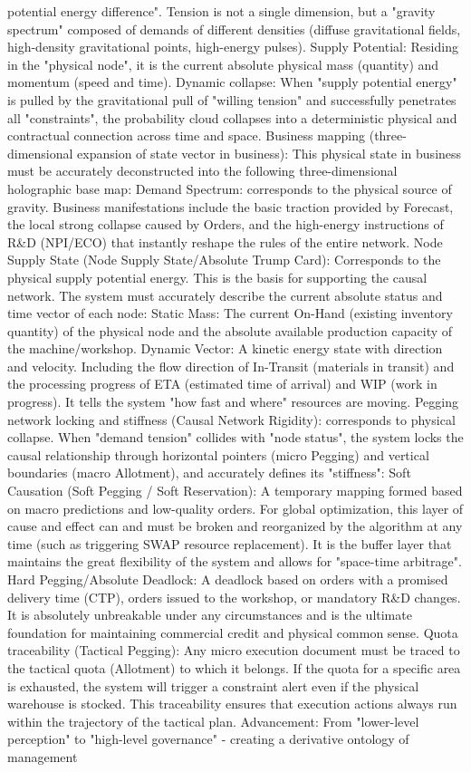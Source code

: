 \documentclass[11pt,a4paper]{article}
\begin{document}
potential energy difference". Tension is not a single dimension, but a "gravity spectrum" composed of demands of different densities (diffuse gravitational fields, high-density gravitational points, high-energy pulses). Supply Potential: Residing in the "physical node", it is the current absolute physical mass (quantity) and momentum (speed and time). Dynamic collapse: When "supply potential energy" is pulled by the gravitational pull of "willing tension" and successfully penetrates all "constraints", the probability cloud collapses into a deterministic physical and contractual connection across time and space. Business mapping (three-dimensional expansion of state vector in business): This physical state in business must be accurately deconstructed into the following three-dimensional holographic base map: Demand Spectrum: corresponds to the physical source of gravity. Business manifestations include the basic traction provided by Forecast, the local strong collapse caused by Orders, and the high-energy instructions of R\&D (NPI/ECO) that instantly reshape the rules of the entire network. Node Supply State (Node Supply State/Absolute Trump Card): Corresponds to the physical supply potential energy. This is the basis for supporting the causal network. The system must accurately describe the current absolute status and time vector of each node: Static Mass: The current On-Hand (existing inventory quantity) of the physical node and the absolute available production capacity of the machine/workshop. Dynamic Vector: A kinetic energy state with direction and velocity. Including the flow direction of In-Transit (materials in transit) and the processing progress of ETA (estimated time of arrival) and WIP (work in progress). It tells the system "how fast and where" resources are moving. Pegging network locking and stiffness (Causal Network Rigidity): corresponds to physical collapse. When "demand tension" collides with "node status", the system locks the causal relationship through horizontal pointers (micro Pegging) and vertical boundaries (macro Allotment), and accurately defines its "stiffness": Soft Causation (Soft Pegging / Soft Reservation): A temporary mapping formed based on macro predictions and low-quality orders. For global optimization, this layer of cause and effect can and must be broken and reorganized by the algorithm at any time (such as triggering SWAP resource replacement). It is the buffer layer that maintains the great flexibility of the system and allows for "space-time arbitrage". Hard Pegging/Absolute Deadlock: A deadlock based on orders with a promised delivery time (CTP), orders issued to the workshop, or mandatory R\&D changes. It is absolutely unbreakable under any circumstances and is the ultimate foundation for maintaining commercial credit and physical common sense. Quota traceability (Tactical Pegging): Any micro execution document must be traced to the tactical quota (Allotment) to which it belongs. If the quota for a specific area is exhausted, the system will trigger a constraint alert even if the physical warehouse is stocked. This traceability ensures that execution actions always run within the trajectory of the tactical plan. Advancement: From "lower-level perception" to "high-level governance" - creating a derivative ontology of management 
\end{document}
